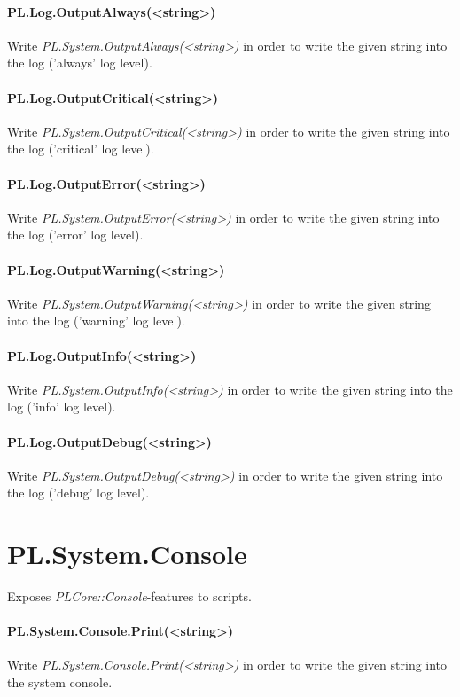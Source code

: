 \paragraph{PL.Log.OutputAlways(<string>)}
Write \emph{PL.System.OutputAlways(<string>)} in order to write the given string into the log ('always' log level).

\paragraph{PL.Log.OutputCritical(<string>)}
Write \emph{PL.System.OutputCritical(<string>)} in order to write the given string into the log ('critical' log level).

\paragraph{PL.Log.OutputError(<string>)}
Write \emph{PL.System.OutputError(<string>)} in order to write the given string into the log ('error' log level).

\paragraph{PL.Log.OutputWarning(<string>)}
Write \emph{PL.System.OutputWarning(<string>)} in order to write the given string into the log ('warning' log level).

\paragraph{PL.Log.OutputInfo(<string>)}
Write \emph{PL.System.OutputInfo(<string>)} in order to write the given string into the log ('info' log level).

\paragraph{PL.Log.OutputDebug(<string>)}
Write \emph{PL.System.OutputDebug(<string>)} in order to write the given string into the log ('debug' log level).




\section{PL.System.Console}
Exposes \emph{PLCore::Console}-features to scripts.

\paragraph{PL.System.Console.Print(<string>)}
Write \emph{PL.System.Console.Print(<string>)} in order to write the given string into the system console.




